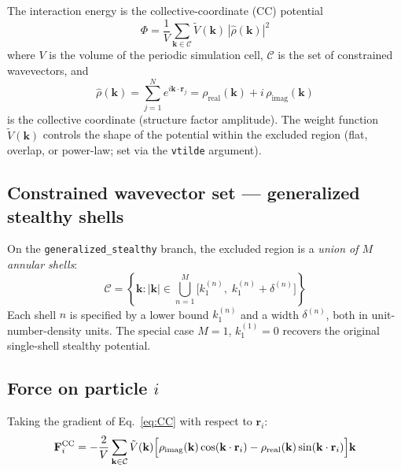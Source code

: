 \documentclass[12pt,a4paper]{article}
\begin{document}
The interaction energy is the collective-coordinate (CC) potential
\begin{equation}
    \Phi = \frac{1}{V} \sum_{\mathbf{k} \in \mathcal{C}}
           \tilde{V}(\mathbf{k})\,|\hat{\rho}(\mathbf{k})|^2
    \label{eq:CC}
\end{equation}
where $V$ is the volume of the periodic simulation cell,
$\mathcal{C}$ is the set of constrained wavevectors, and
\begin{equation}
    \hat{\rho}(\mathbf{k}) = \sum_{j=1}^{N} e^{i\mathbf{k}\cdot\mathbf{r}_j}
    = \rho_\text{real}(\mathbf{k}) + i\,\rho_\text{imag}(\mathbf{k})
\end{equation}
is the collective coordinate (structure factor amplitude).
The weight function $\tilde{V}(\mathbf{k})$ controls the shape of the
potential within the excluded region (flat, overlap, or power-law; set via
the \texttt{vtilde} argument).

\subsection{Constrained wavevector set --- generalized stealthy shells}

On the \texttt{generalized\_stealthy} branch, the excluded region is a
\emph{union of $M$ annular shells}:
\begin{equation}
    \mathcal{C} = \left\{\mathbf{k} :
    |\mathbf{k}| \in \bigcup_{n=1}^{M}
    \bigl[k_1^{(n)},\; k_1^{(n)} + \delta^{(n)}\bigr]\right\}
\end{equation}
Each shell $n$ is specified by a lower bound $k_1^{(n)}$ and a width
$\delta^{(n)}$, both in unit-number-density units.
The special case $M=1$, $k_1^{(1)}=0$ recovers the original single-shell
stealthy potential.

\subsection{Force on particle $i$}

Taking the gradient of Eq.~\eqref{eq:CC} with respect to $\mathbf{r}_i$:
\begin{equation}
    \mathbf{F}_i^{\text{CC}} = -\frac{2}{V}
    \sum_{\mathbf{k}\in\mathcal{C}} \tilde{V}(\mathbf{k})
    \Bigl[
        \rho_\text{imag}(\mathbf{k})\cos(\mathbf{k}\cdot\mathbf{r}_i)
        - \rho_\text{real}(\mathbf{k})\sin(\mathbf{k}\cdot\mathbf{r}_i)
    \Bigr]\mathbf{k}
    \label{eq:force}
\end{equation}
\end{document}
